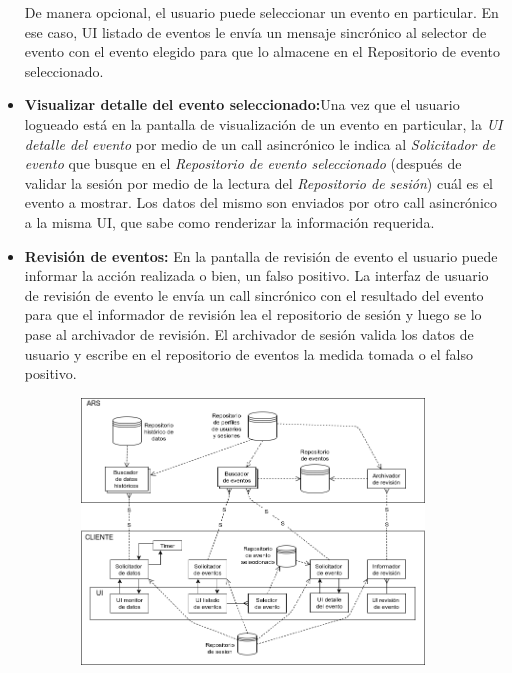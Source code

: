 \begin{itemize}
    De manera opcional, el usuario puede seleccionar un evento en particular. En ese caso, UI listado de eventos le envía un mensaje sincrónico al selector de evento con el evento elegido para que lo almacene en el Repositorio de evento seleccionado.
    \item \textbf{Visualizar detalle del evento seleccionado:}Una vez que el usuario logueado está en la pantalla de visualización de un evento en particular, la \textit{UI detalle del evento} por medio de un call asincrónico le indica al \textit{Solicitador de evento} que busque en el \textit{Repositorio de evento seleccionado} (después de validar la sesión por medio de la lectura del \textit{Repositorio de sesión}) cuál es el evento a mostrar. Los datos del mismo son enviados por otro call asincrónico a la misma UI, que sabe como renderizar la información requerida.
    \item \textbf{Revisión de eventos:} En la pantalla de revisión de evento el usuario puede informar la acción realizada o bien, un falso positivo. La interfaz de usuario de revisión de evento le envía un call sincrónico con el resultado del evento para que el informador de revisión lea el repositorio de sesión y luego se lo pase al archivador de revisión. El archivador de sesión valida los datos de usuario y escribe en el repositorio de eventos la medida tomada o el falso positivo.
\end{itemize}

\begin{figure}[H]
  \begin{subfigure}{\textwidth}
    \includegraphics[width=\textwidth]{imagenes/diagramas/interaccionConClientes.png}
  \end{subfigure}
  \label{}
  \caption{}
\end{figure}

